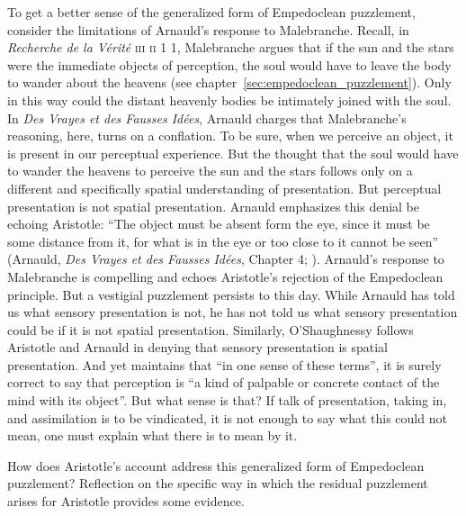 To get a better sense of the generalized form of Empedoclean puzzlement, consider the limitations of Arnauld's response to Malebranche. Recall, in \emph{Recherche de la V\'{e}rit\'{e}} \textsc{iii} \textsc{ii} 1 1, Malebranche argues that if the sun and the stars were the immediate objects of perception, the soul would have to leave the body to wander about the heavens (see chapter~\ref{sec:empedoclean_puzzlement}). Only in this way could the distant heavenly bodies be intimately joined with the soul. In \emph{Des Vrayes et des Fausses Id\'{e}es}, Arnauld charges that Malebranche's reasoning, here, turns on a conflation. To be sure, when we perceive an object, it is present in our perceptual experience. But the thought that the soul would have to wander the heavens to perceive the sun and the stars follows only on a different and specifically spatial understanding of presentation. But perceptual presentation is not spatial presentation. Arnauld emphasizes this denial be echoing Aristotle: ``The object must be absent form the eye, since it must be some distance from it, for what is in the eye or too close to it cannot be seen'' (Arnauld, \emph{Des Vrayes et des Fausses Id\'{e}es}, Chapter 4; \citealt[62]{Gaukroger:1990rz}). Arnauld's response to Malebranche is compelling and echoes Aristotle's rejection of the Empedoclean principle. But a vestigial puzzlement persists to this day. While Arnauld has told us what sensory presentation is not, he has not told us what sensory presentation could be if it is not spatial presentation. Similarly, O'Shaughnessy follows Aristotle and Arnauld in denying that sensory presentation is spatial presentation. And yet \citet[183]{OShaughnessy:2003eu} maintains that ``in one sense of these terms'', it is surely correct to say that perception is ``a kind of palpable or concrete contact of the mind with its object''. But what sense is that? If talk of presentation, taking in, and assimilation is to be vindicated, it is not enough to say what this could not mean, one must explain what there is to mean by it.

How does Aristotle's account address this generalized form of Empedoclean puzzlement? Reflection on the specific way in which the residual puzzlement arises for Aristotle provides some evidence.

